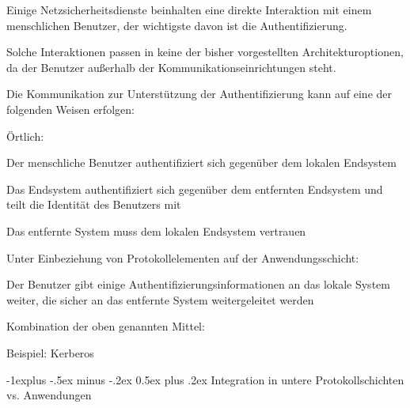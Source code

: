 \documentclass[a4paper]{article}
\makeatletter
\renewcommand{\subsection}{\@startsection{subsection}{2}{0mm}%
 {-1explus -.5ex minus -.2ex}%
 {0.5ex plus .2ex}%
 {\normalfont\normalsize\bfseries}}
\makeatother
\begin{document}
\begin{multicols}{3}
      \begin{itemize*}
            \item Einige Netzsicherheitsdienste beinhalten eine direkte Interaktion mit
            einem menschlichen Benutzer, der wichtigste davon ist die
            Authentifizierung.
            \item Solche Interaktionen passen in keine der bisher vorgestellten
            Architekturoptionen, da der Benutzer außerhalb der
            Kommunikationseinrichtungen steht.
            \item Die Kommunikation zur Unterstützung der Authentifizierung kann auf
            eine der folgenden Weisen erfolgen:
            \begin{itemize*}
                  \item Örtlich:
                  \begin{itemize*} \item Der menschliche Benutzer authentifiziert sich gegenüber dem lokalen Endsystem \item Das Endsystem authentifiziert sich gegenüber dem entfernten Endsystem und teilt die Identität des Benutzers mit \item Das entfernte System muss dem lokalen Endsystem vertrauen \end{itemize*}
                  \item Unter Einbeziehung von Protokollelementen auf der Anwendungsschicht:
                  \begin{itemize*} \item Der Benutzer gibt einige Authentifizierungsinformationen an das lokale System weiter, die sicher an das entfernte System weitergeleitet werden \end{itemize*}
                  \item Kombination der oben genannten Mittel:
                  \begin{itemize*} \item Beispiel: Kerberos \end{itemize*}
            \end{itemize*}
      \end{itemize*}


      \subsection{Integration in untere Protokollschichten vs.
            Anwendungen}


\end{multicols}
\end{document}

